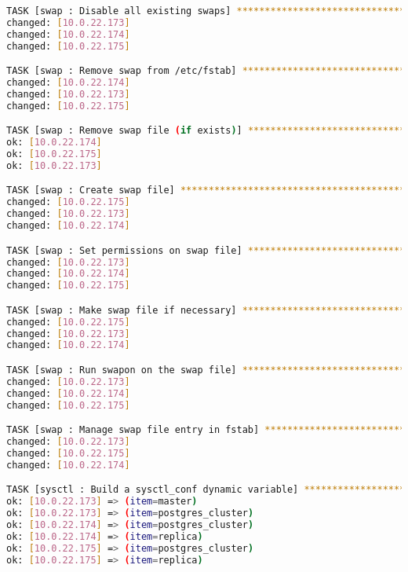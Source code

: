 \begin{flushleft}
\begin{lstlisting}[language=bash, caption=Deploy - Anhang - Deployt,captionpos=b,label={lst:deploy-appendix-deployt},breaklines=true]
TASK [swap : Disable all existing swaps] **************************************************************************************************************************************************************************
changed: [10.0.22.173]
changed: [10.0.22.174]
changed: [10.0.22.175]

TASK [swap : Remove swap from /etc/fstab] *************************************************************************************************************************************************************************
changed: [10.0.22.174]
changed: [10.0.22.173]
changed: [10.0.22.175]

TASK [swap : Remove swap file (if exists)] ************************************************************************************************************************************************************************
ok: [10.0.22.174]
ok: [10.0.22.175]
ok: [10.0.22.173]

TASK [swap : Create swap file] ************************************************************************************************************************************************************************************
changed: [10.0.22.175]
changed: [10.0.22.173]
changed: [10.0.22.174]

TASK [swap : Set permissions on swap file] ************************************************************************************************************************************************************************
changed: [10.0.22.173]
changed: [10.0.22.174]
changed: [10.0.22.175]

TASK [swap : Make swap file if necessary] *************************************************************************************************************************************************************************
changed: [10.0.22.175]
changed: [10.0.22.173]
changed: [10.0.22.174]

TASK [swap : Run swapon on the swap file] *************************************************************************************************************************************************************************
changed: [10.0.22.173]
changed: [10.0.22.174]
changed: [10.0.22.175]

TASK [swap : Manage swap file entry in fstab] *********************************************************************************************************************************************************************
changed: [10.0.22.173]
changed: [10.0.22.175]
changed: [10.0.22.174]

TASK [sysctl : Build a sysctl_conf dynamic variable] **************************************************************************************************************************************************************
ok: [10.0.22.173] => (item=master)
ok: [10.0.22.173] => (item=postgres_cluster)
ok: [10.0.22.174] => (item=postgres_cluster)
ok: [10.0.22.174] => (item=replica)
ok: [10.0.22.175] => (item=postgres_cluster)
ok: [10.0.22.175] => (item=replica)


\end{lstlisting}
\end{flushleft}
